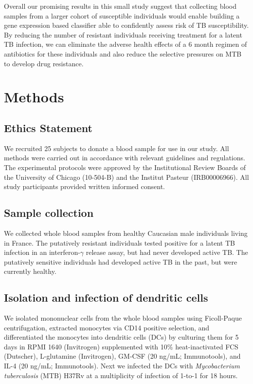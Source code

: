 \documentclass[fleqn,10pt]{wlscirep}
\begin{document}
Overall our promising results in this small study suggest that
collecting blood samples from a larger cohort of susceptible
individuals would enable building a gene expression based classifier
able to confidently assess risk of TB susceptibility. By reducing the
number of resistant individuals receiving treatment for a latent TB
infection, we can eliminate the adverse health effects of a 6 month
regimen of antibiotics for these individuals and also reduce the
selective pressures on MTB to develop drug resistance.
\section*{Methods}

\subsection*{Ethics Statement}

We recruited 25 subjects to donate a blood sample for use in our
study. All methods were carried out in accordance with relevant
guidelines and regulations. The experimental protocols were approved
by the Institutional Review Boards of the University of Chicago
(10-504-B) and the Institut Pasteur (IRB00006966). All study
participants provided written informed consent.
\subsection*{Sample collection}

We collected whole blood samples from healthy Caucasian male
individuals living in France. The putatively resistant individuals
tested positive for a latent TB infection in an interferon-$\gamma$
release assay, but had never developed active TB. The putatively
sensitive individuals had developed active TB in the past, but were
currently healthy.
\subsection*{Isolation and infection of dendritic cells}

We isolated mononuclear cells from the whole blood samples using
Ficoll-Paque centrifugation, extracted monocytes via CD14 positive
selection, and differentiated the monocytes into dendritic cells (DCs)
by culturing them for 5 days in RPMI 1640 (Invitrogen) supplemented
with 10\% heat-inactivated FCS (Dutscher), L-glutamine (Invitrogen),
GM-CSF (20 ng/mL; Immunotools), and IL-4 (20 ng/mL; Immunotools). Next
we infected the DCs with \emph{Mycobacterium tuberculosis} (MTB) H37Rv
at a multiplicity of infection of 1-to-1 for 18 hours.
\end{document}
